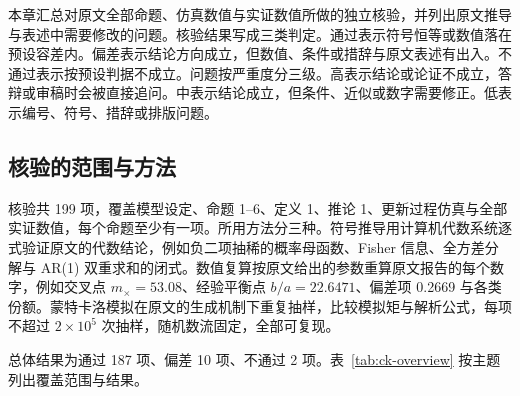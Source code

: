 本章汇总对原文全部命题、仿真数值与实证数值所做的独立核验，并列出原文推导与表述中需要修改的问题。核验结果写成三类判定。通过表示符号恒等或数值落在预设容差内。偏差表示结论方向成立，但数值、条件或措辞与原文表述有出入。不通过表示按预设判据不成立。问题按严重度分三级。高表示结论或论证不成立，答辩或审稿时会被直接追问。中表示结论成立，但条件、近似或数字需要修正。低表示编号、符号、措辞或排版问题。

\subsection{核验的范围与方法}

核验共 199 项，覆盖模型设定、命题 1--6、定义 1、推论 1、更新过程仿真与全部实证数值，每个命题至少有一项。所用方法分三种。符号推导用计算机代数系统逐式验证原文的代数结论，例如负二项抽稀的概率母函数、Fisher 信息、全方差分解与 AR(1) 双重求和的闭式。数值复算按原文给出的参数重算原文报告的每个数字，例如交叉点 $m_\times=53.08$、经验平衡点 $b/a=22.6471$、偏差项 0.2669 与各类份额。蒙特卡洛模拟在原文的生成机制下重复抽样，比较模拟矩与解析公式，每项不超过 $2\times10^5$ 次抽样，随机数流固定，全部可复现。

总体结果为通过 187 项、偏差 10 项、不通过 2 项。表~\ref{tab:ck-overview} 按主题列出覆盖范围与结果。

